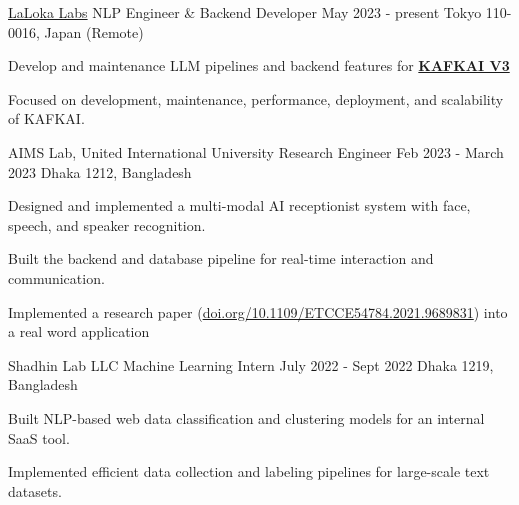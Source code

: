 \begin{cventries}
  \cventry
    {\href{https://lalokalabs.co/en/}{LaLoka Labs}} %
    {NLP Engineer \& Backend Developer} %
    {May 2023 - present} %
    {Tokyo 110-0016, Japan (Remote)} %
    {
      \begin{cvitems} %
        \item{Develop and maintenance LLM pipelines and backend features for \href{https://kafkai.com/}{\textcolor{Cerulean}{\textbf{KAFKAI V3}}}}
        \item{Focused on development, maintenance, performance, deployment, and scalability of KAFKAI.}
      \end{cvitems}
    }    

  \cventry
    {AIMS Lab, United International University} %
    {Research Engineer} %
    {Feb 2023 - March 2023} %
    {Dhaka 1212, Bangladesh} %
    {
      \begin{cvitems} %
        \item{Designed and implemented a multi-modal AI receptionist system with face, speech, and speaker recognition.}
        \item{Built the backend and database pipeline for real-time interaction and communication.}
        \item{Implemented a research paper (\href{https://doi.org/10.1109/ETCCE54784.2021.9689831}{doi.org/10.1109/ETCCE54784.2021.9689831}) into a real word application}
      \end{cvitems}
    }    

  \cventry
    {Shadhin Lab LLC} %
    {Machine Learning Intern} %
    {July 2022 - Sept 2022} %
    {Dhaka 1219, Bangladesh} %
    {
      \begin{cvitems} 
      \item{
      Built NLP-based web data classification and clustering models for an internal SaaS tool.
      }
      \item{Implemented efficient data collection and labeling pipelines for large-scale text datasets.}
      \end{cvitems}
    }
    

\end{cventries}
